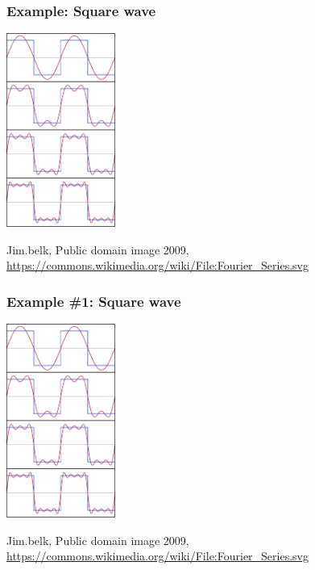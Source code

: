 \documentclass{beamer}
\begin{document}
\begin{frame}
  \frametitle{Example: Square wave}

  \centerline{\includegraphics[height=2.5in]{squarewave.png}}
  \begin{tiny}
    Jim.belk, Public domain image 2009,
    \url{https://commons.wikimedia.org/wiki/File:Fourier_Series.svg}
  \end{tiny}
\end{frame}

\begin{frame}
  \frametitle{Example \#1: Square wave}

  \centerline{\includegraphics[height=2.5in]{squarewave.png}}
  \begin{tiny}
    Jim.belk, Public domain image 2009,
    \url{https://commons.wikimedia.org/wiki/File:Fourier_Series.svg}
  \end{tiny}
\end{frame}

\end{document}
